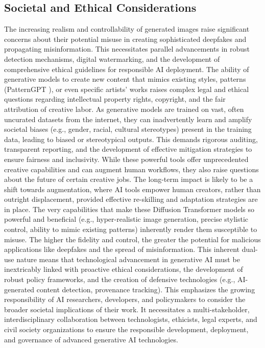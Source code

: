 \documentclass[a4paper]{article}
\begin{document}
\subsection{Societal and Ethical Considerations}
The increasing realism and controllability of generated images raise significant concerns about their potential misuse in creating sophisticated deepfakes and propagating misinformation. This necessitates parallel advancements in robust detection mechanisms, digital watermarking, and the development of comprehensive ethical guidelines for responsible AI deployment. The ability of generative models to create new content that mimics existing styles, patterns (PatternGPT \cite{Riso2024StructuredPattern}), or even specific artists' works raises complex legal and ethical questions regarding intellectual property rights, copyright, and the fair attribution of creative labor. As generative models are trained on vast, often uncurated datasets from the internet, they can inadvertently learn and amplify societal biases (e.g., gender, racial, cultural stereotypes) present in the training data, leading to biased or stereotypical outputs. This demands rigorous auditing, transparent reporting, and the development of effective mitigation strategies to ensure fairness and inclusivity. While these powerful tools offer unprecedented creative capabilities and can augment human workflows, they also raise questions about the future of certain creative jobs. The long-term impact is likely to be a shift towards augmentation, where AI tools empower human creators, rather than outright displacement, provided effective re-skilling and adaptation strategies are in place. The very capabilities that make these Diffusion Transformer models so powerful and beneficial (e.g., hyper-realistic image generation, precise stylistic control, ability to mimic existing patterns) inherently render them susceptible to misuse. The higher the fidelity and control, the greater the potential for malicious applications like deepfakes and the spread of misinformation. This inherent dual-use nature means that technological advancement in generative AI must be inextricably linked with proactive ethical considerations, the development of robust policy frameworks, and the creation of defensive technologies (e.g., AI-generated content detection, provenance tracking). This emphasizes the growing responsibility of AI researchers, developers, and policymakers to consider the broader societal implications of their work. It necessitates a multi-stakeholder, interdisciplinary collaboration between technologists, ethicists, legal experts, and civil society organizations to ensure the responsible development, deployment, and governance of advanced generative AI technologies.
\end{document}

